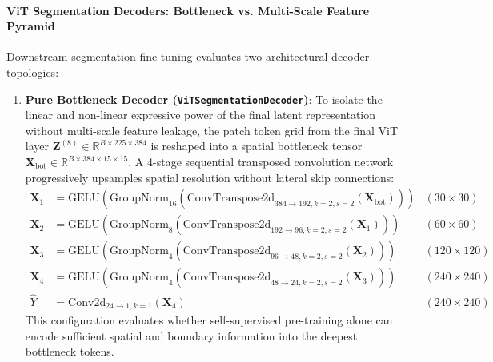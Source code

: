 \documentclass{article}
\begin{document}
\paragraph{ViT Segmentation Decoders: Bottleneck vs. Multi-Scale Feature Pyramid}
Downstream segmentation fine-tuning evaluates two architectural decoder topologies:
\begin{enumerate}
    \item \textbf{Pure Bottleneck Decoder (\texttt{ViTSegmentationDecoder})}: To isolate the linear and non-linear expressive power of the final latent representation without multi-scale feature leakage, the patch token grid from the final ViT layer $\mathbf{Z}^{(8)} \in \mathbb{R}^{B \times 225 \times 384}$ is reshaped into a spatial bottleneck tensor $\mathbf{X}_{\text{bot}} \in \mathbb{R}^{B \times 384 \times 15 \times 15}$. A 4-stage sequential transposed convolution network progressively upsamples spatial resolution without lateral skip connections:
    \begin{align}
        \mathbf{X}_1 &= \text{GELU}\left(\text{GroupNorm}_{16}\left(\text{ConvTranspose2d}_{384 \to 192, k=2, s=2}(\mathbf{X}_{\text{bot}})\right)\right) & (30 \times 30) \\
        \mathbf{X}_2 &= \text{GELU}\left(\text{GroupNorm}_{8}\left(\text{ConvTranspose2d}_{192 \to 96, k=2, s=2}(\mathbf{X}_1)\right)\right) & (60 \times 60) \\
        \mathbf{X}_3 &= \text{GELU}\left(\text{GroupNorm}_{4}\left(\text{ConvTranspose2d}_{96 \to 48, k=2, s=2}(\mathbf{X}_2)\right)\right) & (120 \times 120) \\
        \mathbf{X}_4 &= \text{GELU}\left(\text{GroupNorm}_{4}\left(\text{ConvTranspose2d}_{48 \to 24, k=2, s=2}(\mathbf{X}_3)\right)\right) & (240 \times 240) \\
        \hat{Y} &= \text{Conv2d}_{24 \to 1, k=1}(\mathbf{X}_4) & (240 \times 240)
    \end{align}
    This configuration evaluates whether self-supervised pre-training alone can encode sufficient spatial and boundary information into the deepest bottleneck tokens.


\end{enumerate}
\end{document}

